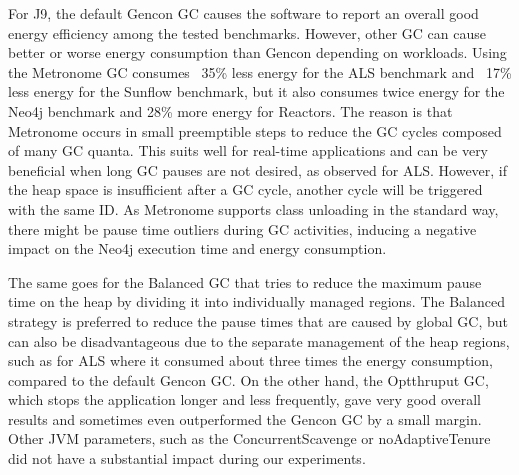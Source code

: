 For \textsc{J9}, the default \textsf{Gencon} GC causes the software to report an overall good energy efficiency among the tested benchmarks.
However, other GC can cause better or worse energy consumption than \textsf{Gencon} depending on workloads.
Using the \textsf{Metronome} GC consumes ~35\% less energy for the \textsf{ALS} benchmark and ~17\% less energy for the \textsf{Sunflow} benchmark, but it also consumes twice energy for the \textsf{Neo4j} benchmark and 28\% more energy for \textsf{Reactors}.
The reason is that \textsf{Metronome} occurs in small preemptible steps to reduce the GC cycles composed of many GC quanta.
This suits well for real-time applications and can be very beneficial when long GC pauses are not desired, as observed for \textsf{ALS}.
However, if the heap space is insufficient after a GC cycle, another cycle will be triggered with the same ID.
As \textsf{Metronome} supports class unloading in the standard way, there might be pause time outliers during GC activities, inducing a negative impact on the \textsf{Neo4j} execution time and energy consumption.

The same goes for the \textsf{Balanced} GC that tries to reduce the maximum pause time on the heap by dividing it into individually managed regions.
The \textsf{Balanced} strategy is preferred to reduce the pause times that are caused by global GC, but can also be disadvantageous due to the separate management of the heap regions, such as for \textsf{ALS} where it consumed about three times the energy consumption, compared to the default \textsf{Gencon} GC.
On the other hand, the \textsf{Optthruput} GC, which stops the application longer and less frequently, gave very good overall results and sometimes even outperformed the \textsf{Gencon} GC by a small margin.
Other JVM parameters, such as the \textsf{ConcurrentScavenge} or \textsf{noAdaptiveTenure} did not have a substantial impact during our experiments.

